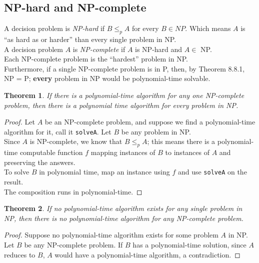 \documentclass[12pt]{article}
\theoremstyle{plain}
\newtheorem{theorem}{Theorem}[subsection]
\theoremstyle{definition}
\begin{document}
\subsection{NP-hard and NP-complete}
A decision problem is \emph{NP-hard} if $B \leq_{p} A$ for every $B \in NP$.
Which means $A$ is ``as hard as or harder'' than every single problem in NP. \\

A decision problem $A$ is \emph{NP-complete} if $A$ is NP-hard and $A \in$ NP. \\

Each NP-complete problem is the ``hardest'' problem in NP. \\
Furthermore, if a single NP-complete problem is in P, then, by Theorem 8.8.1, NP = P;
\textbf{every} problem in NP would be polynomial-time solvable.

\begin{theorem}
If there is a polynomial-time algorithm for any one NP-complete problem, then there is a polynomial time algorithm for every problem in NP.
\end{theorem}
\begin{proof}
Let $A$ be an NP-complete problem, and suppose we find a polynomial-time algorithm for it, call it \texttt{solveA}.
Let $B$ be any problem in NP. \\
Since $A$ is NP-complete, we know that $B \leq_{p} A$;
this means there is a polynomial-time computable function $f$ mapping instances of $B$ to instances of $A$ and preserving the answers. \\
To solve $B$ in polynomial time, map an instance using $f$ and use \texttt{solveA} on the result. \\
The composition runs in polynomial-time.
\end{proof}

\begin{theorem}
If no polynomial-time algorithm exists for any single problem in NP, then there is no polynomial-time algorithm for any NP-complete problem.
\end{theorem}
\begin{proof}
Suppose no polynomial-time algorithm exists for some problem $A$ in NP. \\
Let $B$ be any NP-complete problem.
If $B$ has a polynomial-time solution, since $A$ reduces to $B$, $A$ would have a polynomial-time algorithm, a contradiction.
\end{proof}
\end{document}
